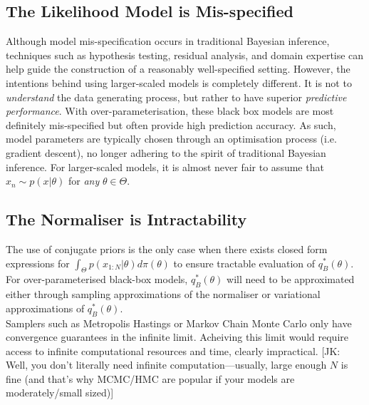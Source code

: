 \documentclass[twoside,11pt]{article}
\newcommand{\jk}[1]{{\color{blue} [JK: #1]}}
\begin{document}
\subsection{The Likelihood Model is Mis-specified}
Although model mis-specification occurs in traditional Bayesian inference, techniques such as hypothesis testing, residual analysis, and domain expertise can help guide the construction of a reasonably well-specified setting. However, the intentions behind using larger-scaled models is completely different. It is not to \textit{understand} the data generating process, but rather to have superior \textit{predictive performance}. With over-parameterisation, these black box models are most definitely mis-specified but often provide high prediction accuracy. As such, model parameters are typically chosen through an optimisation process (i.e. gradient descent), no longer adhering to the spirit of traditional Bayesian inference. For larger-scaled models, it is almost never fair to assume that $x_n \sim p(x|\theta)$ for \textit{any} $\theta \in \Theta$.

\subsection{The Normaliser is Intractability}
The use of conjugate priors is the only case when there exists closed form expressions for $\int_{\Theta} p(x_{1:N}|\theta) d \pi(\theta)$ to ensure tractable evaluation of $q_B^*(\theta)$. For over-parameterised black-box models, $q_B^*(\theta)$ will need to be approximated either through sampling approximations of the normaliser or variational approximations of $q_B^*(\theta)$.
\newline
\\Samplers such as Metropolis Hastings or Markov Chain Monte Carlo only have convergence guarantees in the infinite limit. Acheiving this limit would require access to infinite computational resources and time, clearly impractical. 
\jk{Well, you don't literally need infinite computation---usually, large enough $N$ is fine (and that's why MCMC/HMC are popular if your models are moderately/small sized)}
\end{document}
